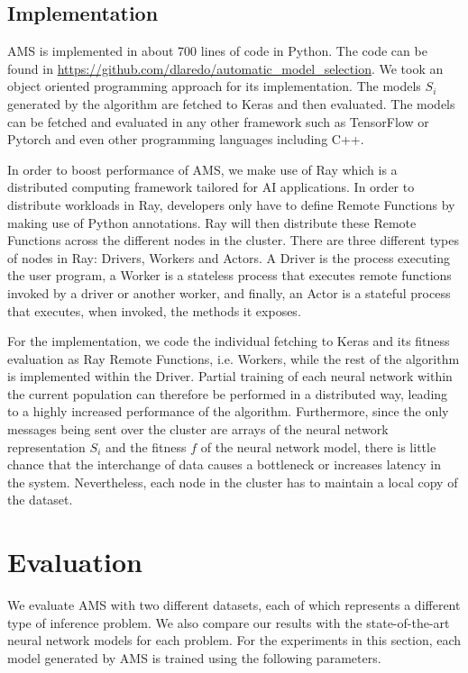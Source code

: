 \documentclass[12pt]{elsart}%
\begin{document}
\subsection{Implementation}
\label{sec:implementation}

AMS is implemented in about 700 lines of code in Python. The code can be found in \url{https://github.com/dlaredo/automatic_model_selection}. We took an object oriented programming approach for its implementation. The models $S_i$ generated by the algorithm are fetched to Keras \cite{keras2015} and then evaluated. The models can be fetched and evaluated in any other framework such as TensorFlow or Pytorch and even other programming languages including C++.

In order to boost performance of AMS, we make use of Ray \cite{Moritz2017} which is a distributed computing framework tailored for AI applications. In order to distribute workloads in Ray, developers only have to define Remote Functions by making use of Python annotations. Ray will then distribute these Remote Functions across the different nodes in the cluster. There are three different types of nodes in Ray: Drivers, Workers and Actors. A Driver is the process executing the user program, a Worker is a stateless process that executes remote functions invoked by a driver or another worker, and finally, an Actor is a stateful process that executes, when invoked, the methods it exposes.

For the implementation, we code the individual fetching to Keras and its fitness evaluation as Ray Remote Functions, i.e. Workers, while the rest of the algorithm is implemented within the Driver. Partial training of each neural network within the current population can therefore be performed in a distributed way, leading to a highly increased performance of the algorithm. Furthermore, since the only messages being sent over the cluster are arrays of the neural network representation $S_i$ and the fitness $f$ of the neural network model, there is little chance that the interchange of data causes a bottleneck or increases latency in the system. Nevertheless, each node in the cluster has to maintain a local copy of the dataset.

\section{Evaluation}
\label{sec:evaluation}

We evaluate AMS with two different datasets, each of which represents a different type of inference problem. We also compare our results with the state-of-the-art neural network models for each problem. For the experiments in this section, each model generated by AMS is trained using the following parameters.
\end{document}
